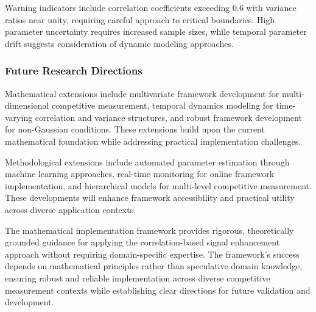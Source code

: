 Warning indicators include correlation coefficients exceeding 0.6 with variance ratios near unity, requiring careful approach to critical boundaries. High parameter uncertainty requires increased sample sizes, while temporal parameter drift suggests consideration of dynamic modeling approaches.

\subsubsection{Future Research Directions}

Mathematical extensions include multivariate framework development for multi-dimensional competitive measurement, temporal dynamics modeling for time-varying correlation and variance structures, and robust framework development for non-Gaussian conditions. These extensions build upon the current mathematical foundation while addressing practical implementation challenges.

Methodological extensions include automated parameter estimation through machine learning approaches, real-time monitoring for online framework implementation, and hierarchical models for multi-level competitive measurement. These developments will enhance framework accessibility and practical utility across diverse application contexts.

The mathematical implementation framework provides rigorous, theoretically grounded guidance for applying the correlation-based signal enhancement approach without requiring domain-specific expertise. The framework's success depends on mathematical principles rather than speculative domain knowledge, ensuring robust and reliable implementation across diverse competitive measurement contexts while establishing clear directions for future validation and development.
